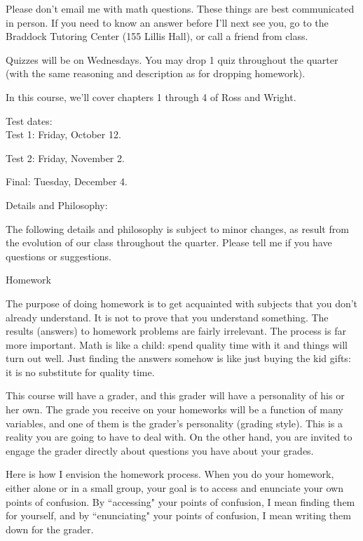 \documentclass[12pt]{letter}
\begin{document}
Please don't email me with math questions.  These things are best 
communicated in person.  If you need to know an answer before I'll next 
see you, go to the Braddock Tutoring Center (155 Lillis Hall), or call a 
friend from class.

Quizzes will be on Wednesdays.  You may drop 1 quiz throughout the quarter 
(with the same reasoning and description as for dropping homework).

In this course, we'll cover chapters 1 through 4 of Ross and Wright.  

Test dates:\\

Test 1: Friday, October 12.

Test 2: Friday, November 2.

Final: Tuesday, December 4.

\vspace{.2in}

\Large Details and Philosophy:\normalsize

The following details and philosophy is subject to minor changes, 
as result from the evolution of our class throughout the quarter.  Please 
tell me if you have questions or suggestions.  

\large Homework\normalsize 

The purpose of doing homework is to get acquainted with subjects that you 
don't already understand.  It is not to prove that you understand 
something.  The results (answers) to homework problems are fairly 
irrelevant.  The process is far more important.  Math is like a child: 
spend quality time with it and things will turn out well.  Just finding 
the answers somehow is like just buying the kid gifts: it is no substitute 
for quality time.

This course will have a grader, and this grader will have a personality of 
his or her own.  The grade you receive on your homeworks will be a 
function of many variables, and one of them is the grader's personality 
(grading style).  This is a reality you are going to have to deal with.  
On the other hand, you are invited to engage the grader directly about 
questions you have about your grades.

Here is how I envision the homework process.  When you do your homework, 
either alone or in a small group, your goal is to access and enunciate 
your own points of confusion.  By ``accessing" your points of confusion, I 
mean finding them for yourself, and by ``enunciating" your points of 
confusion, I mean writing them down for the grader.  
\end{document}
